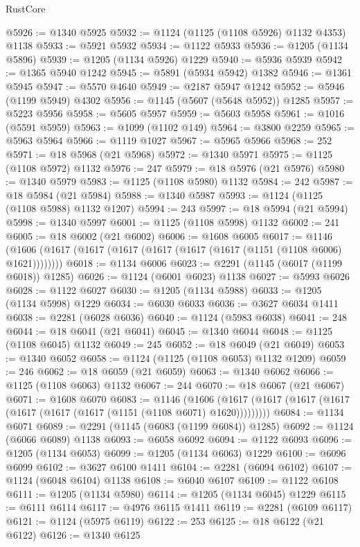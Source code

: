 \begin{lexlean}{RustCore}
\begin{coremodule}
@5926 := @1340 @5925
@5932 := @1124 (@1125 (@1108 @5926) @1132 @4353) @1138
@5933 := @5921 @5932
@5934 := @1122 @5933
@5936 := @1205 (@1134 @5896)
@5939 := @1205 (@1134 @5926) @1229
@5940 := @5936 @5939
@5942 := @1365 @5940 @1242
@5945 := @5891 (@5934 @5942) @1382
@5946 := @1361 @5945
@5947 := @5570 @4640
@5949 := @2187 @5947 @1242
@5952 := @5946 (@1199 @5949) @4302
@5956 := @1145 (@5607 (@5648 @5952)) @1285
@5957 := @5223 @5956
@5958 := @5605 @5957
@5959 := @5603 @5958
@5961 := @1016 (@5591 @5959)
@5963 := @1099 (@1102 @149)
@5964 := @3800 @2259
@5965 := @5963 @5964
@5966 := @1119 @1027
@5967 := @5965 @5966
@5968 := 252
@5971 := @18 @5968 (@21 @5968)
@5972 := @1340 @5971
@5975 := @1125 (@1108 @5972) @1132
@5976 := 247
@5979 := @18 @5976 (@21 @5976)
@5980 := @1340 @5979
@5983 := @1125 (@1108 @5980) @1132
@5984 := 242
@5987 := @18 @5984 (@21 @5984)
@5988 := @1340 @5987
@5993 := @1124 (@1125 (@1108 @5988) @1132 @1207)
@5994 := 243
@5997 := @18 @5994 (@21 @5994)
@5998 := @1340 @5997
@6001 := @1125 (@1108 @5998) @1132
@6002 := 241
@6005 := @18 @6002 (@21 @6002)
@6006 := @1608 @6005
@6017 := @1146 (@1606 (@1617 (@1617 (@1617 (@1617 (@1617 (@1617 (@1151 (@1108 @6006) @1621))))))))
@6018 := @1134 @6006
@6023 := @2291 (@1145 (@6017 (@1199 @6018)) @1285)
@6026 := @1124 (@6001 @6023) @1138
@6027 := @5993 @6026
@6028 := @1122 @6027
@6030 := @1205 (@1134 @5988)
@6033 := @1205 (@1134 @5998) @1229
@6034 := @6030 @6033
@6036 := @3627 @6034 @1411
@6038 := @2281 (@6028 @6036)
@6040 := @1124 (@5983 @6038)
@6041 := 248
@6044 := @18 @6041 (@21 @6041)
@6045 := @1340 @6044
@6048 := @1125 (@1108 @6045) @1132
@6049 := 245
@6052 := @18 @6049 (@21 @6049)
@6053 := @1340 @6052
@6058 := @1124 (@1125 (@1108 @6053) @1132 @1209)
@6059 := 246
@6062 := @18 @6059 (@21 @6059)
@6063 := @1340 @6062
@6066 := @1125 (@1108 @6063) @1132
@6067 := 244
@6070 := @18 @6067 (@21 @6067)
@6071 := @1608 @6070
@6083 := @1146
    (@1606 (@1617 (@1617 (@1617 (@1617 (@1617 (@1617 (@1617 (@1151 (@1108 @6071) @1620)))))))))
@6084 := @1134 @6071
@6089 := @2291 (@1145 (@6083 (@1199 @6084)) @1285)
@6092 := @1124 (@6066 @6089) @1138
@6093 := @6058 @6092
@6094 := @1122 @6093
@6096 := @1205 (@1134 @6053)
@6099 := @1205 (@1134 @6063) @1229
@6100 := @6096 @6099
@6102 := @3627 @6100 @1411
@6104 := @2281 (@6094 @6102)
@6107 := @1124 (@6048 @6104) @1138
@6108 := @6040 @6107
@6109 := @1122 @6108
@6111 := @1205 (@1134 @5980)
@6114 := @1205 (@1134 @6045) @1229
@6115 := @6111 @6114
@6117 := @4976 @6115 @1411
@6119 := @2281 (@6109 @6117)
@6121 := @1124 (@5975 @6119)
@6122 := 253
@6125 := @18 @6122 (@21 @6122)
@6126 := @1340 @6125

\end{coremodule}
\end{lexlean}
